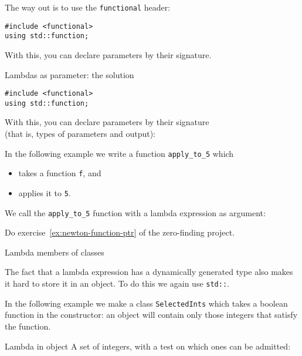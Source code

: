The way out is to use the \lstinline{functional} header:
\begin{lstlisting}
#include <functional>
using std::function;
\end{lstlisting}
With this, you can declare parameters by their signature.

\begin{slide}{Lambdas as parameter: the solution}
  \label{sl:lambda-function-parm}
\begin{lstlisting}
#include <functional>
using std::function;
\end{lstlisting}
With this, you can declare parameters by their signature\\
(that is, types of parameters and output):
%
\end{slide}

In the following example we write a function \lstinline{apply_to_5}
which 
\begin{itemize}
\item takes a function \lstinline{f}, and
\item applies it to \lstinline{5}.
\end{itemize}
We call the \lstinline{apply_to_5} function
with a lambda expression as argument:


\begin{exercise}
  Do exercise~\ref{ex:newton-function-ptr} of the zero-finding project.
\end{exercise}

 {Lambda members of classes}

The fact that a lambda expression has a dynamically generated type
also makes it hard to store it in an object.
To do this we again use \lstinline{std::}.

In the following example we make a class \lstinline{SelectedInts}
which takes a boolean function in the constructor:
an object will contain only those integers that satisfy the function.

\begin{block}{Lambda in object}
  \label{sl:lambda-class}
  A set of integers, with a test on which ones can be admitted:
  \begin{multicols}{2}
  \end{multicols}
\end{block}

